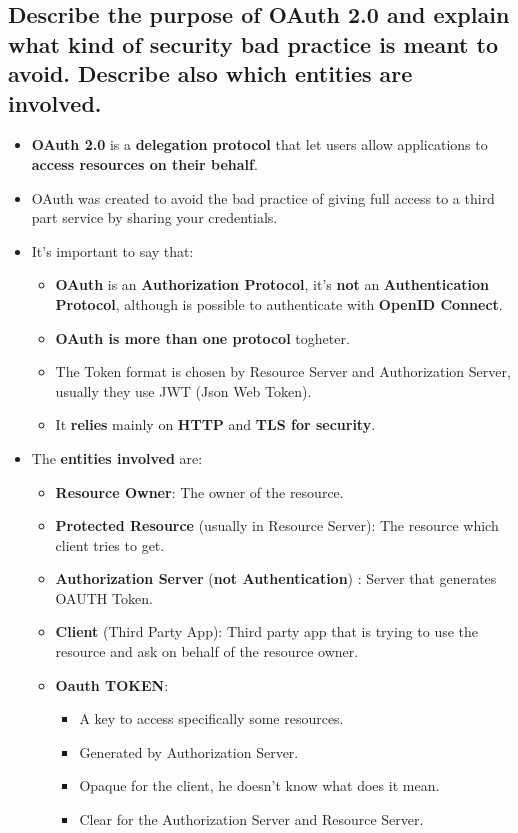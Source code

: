 \documentclass[9pt, letterpaper]{article}
\begin{document}
\subsection{Describe the purpose of OAuth 2.0 and explain what kind of security bad practice is meant to avoid. Describe also which entities are involved.}
\begin{itemize}
	\item \textbf{OAuth 2.0} is a \textbf{delegation protocol} that let users allow applications to \textbf{access resources on their behalf}.
	\item OAuth was created to avoid the bad practice of giving full access to a third part service by sharing your credentials.
	\item It's important to say that:
	      \begin{itemize}
		      \item \textbf{OAuth} is an \textbf{Authorization Protocol}, it's \textbf{not} an \textbf{Authentication Protocol}, although is possible to authenticate with \textbf{OpenID Connect}.
		      \item \textbf{OAuth is more than one protocol} togheter.
		      \item The Token format is chosen by Resource Server and Authorization Server, usually they use JWT (Json Web Token).
		      \item It \textbf{relies} mainly on \textbf{HTTP} and \textbf{TLS for security}.
	      \end{itemize}
	\item The \textbf{entities involved} are:
	      \begin{itemize}
		      \item \textbf{Resource Owner}: The owner of the resource.
		      \item \textbf{Protected Resource} (usually in Resource Server): The resource which client tries to get.
		      \item \textbf{Authorization Server} (\textbf{not Authentication}) : Server that generates OAUTH Token.
		      \item \textbf{Client} (Third Party App): Third party app that is trying to use the resource and ask on behalf of the resource owner.
		      \item \textbf{Oauth TOKEN}:
		            \begin{itemize}
			            \item A key to access specifically some resources.
			            \item Generated by Authorization Server.
			            \item Opaque for the client, he doesn't know what does it mean.
			            \item Clear for the Authorization Server and Resource Server.
		            \end{itemize}
	      \end{itemize}
\end{itemize}
\end{document}
